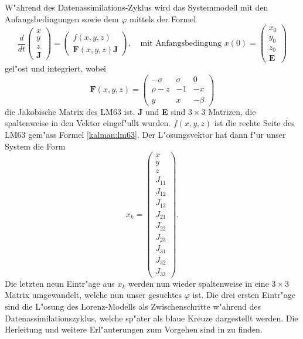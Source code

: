 \begin{refsection}
W"ahrend des Datenassimilations-Zyklus wird das Systemmodell mit den Anfangsbedingungen sowie dem $\varphi$ mittels der Formel
\[
\frac{d}{dt}\begin{pmatrix}
x \\ 
y \\ 
z \\ 
\textbf{J}
\end{pmatrix}=
\begin{pmatrix}
f(x,y,z) \\ 
\textbf{F}(x,y,z)\textbf{J}
\end{pmatrix},
\quad
\text{mit Anfangsbedingung }
x(0)=\begin{pmatrix}
x_{0}\\
y_{0}\\
z_{0}\\ 
\textbf{E}
\end{pmatrix} 
\]
gel"ost und integriert, wobei %
\[
\textbf{F}(x,y,z) = \begin{pmatrix}
-\sigma & \sigma & 0 \\ 
\rho-z & -1 & -x \\ 
y & x & -\beta
\end{pmatrix} 
\]
die Jakobische Matrix des LM63 
ist. \textbf{J} und \textbf{E} sind $3\times3$ Matrizen, die
spaltenweise in den Vektor eingef"ullt wurden. $f(x,y,z)$ ist die
rechte Seite des LM63 gem"ass Formel \eqref{kalman:lm63}. Der
L"osungsvektor hat dann f"ur unser System die Form
\[
x_{k}=\begin{pmatrix}
x \\ 
y \\ 
z \\  
J_{11} \\ 
J_{12} \\ 
J_{13} \\ 
J_{21} \\ 
J_{22} \\ 
J_{23} \\ 
J_{31} \\ 
J_{32} \\
J_{33} 
\end{pmatrix}.
\]
Die letzten neun Eintr"age aus $x_{k}$ werden nun wieder spaltenweise
in eine $3\times 3$ Matrix umgewandelt, welche nun unser gesuchtes
$\varphi$ ist. Die drei ersten Eintr"age sind die L"osung des
Lorenz-Modells als Zwischenschritte w"ahrend des Datenassimilationszyklus,
welche sp"ater als blaue Kreuze dargestellt werden. Die Herleitung
und weitere Erl"auterungen zum Vorgehen sind in \cite{skript:DiffGl}
zu finden.


\end{refsection}
